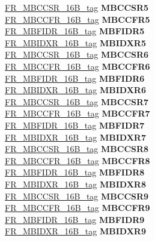 \begin{DoxyCompactItemize}
\begin{tabbing}
\>\>\mbox{\hyperlink{unionFR__MBCCSR__16B__tag}{FR\_MBCCSR\_16B\_tag}} {\bfseries MBCCSR5}\\
\>\>\mbox{\hyperlink{unionFR__MBCCFR__16B__tag}{FR\_MBCCFR\_16B\_tag}} {\bfseries MBCCFR5}\\
\>\>\mbox{\hyperlink{unionFR__MBFIDR__16B__tag}{FR\_MBFIDR\_16B\_tag}} {\bfseries MBFIDR5}\\
\>\>\mbox{\hyperlink{unionFR__MBIDXR__16B__tag}{FR\_MBIDXR\_16B\_tag}} {\bfseries MBIDXR5}\\
\>\>\mbox{\hyperlink{unionFR__MBCCSR__16B__tag}{FR\_MBCCSR\_16B\_tag}} {\bfseries MBCCSR6}\\
\>\>\mbox{\hyperlink{unionFR__MBCCFR__16B__tag}{FR\_MBCCFR\_16B\_tag}} {\bfseries MBCCFR6}\\
\>\>\mbox{\hyperlink{unionFR__MBFIDR__16B__tag}{FR\_MBFIDR\_16B\_tag}} {\bfseries MBFIDR6}\\
\>\>\mbox{\hyperlink{unionFR__MBIDXR__16B__tag}{FR\_MBIDXR\_16B\_tag}} {\bfseries MBIDXR6}\\
\>\>\mbox{\hyperlink{unionFR__MBCCSR__16B__tag}{FR\_MBCCSR\_16B\_tag}} {\bfseries MBCCSR7}\\
\>\>\mbox{\hyperlink{unionFR__MBCCFR__16B__tag}{FR\_MBCCFR\_16B\_tag}} {\bfseries MBCCFR7}\\
\>\>\mbox{\hyperlink{unionFR__MBFIDR__16B__tag}{FR\_MBFIDR\_16B\_tag}} {\bfseries MBFIDR7}\\
\>\>\mbox{\hyperlink{unionFR__MBIDXR__16B__tag}{FR\_MBIDXR\_16B\_tag}} {\bfseries MBIDXR7}\\
\>\>\mbox{\hyperlink{unionFR__MBCCSR__16B__tag}{FR\_MBCCSR\_16B\_tag}} {\bfseries MBCCSR8}\\
\>\>\mbox{\hyperlink{unionFR__MBCCFR__16B__tag}{FR\_MBCCFR\_16B\_tag}} {\bfseries MBCCFR8}\\
\>\>\mbox{\hyperlink{unionFR__MBFIDR__16B__tag}{FR\_MBFIDR\_16B\_tag}} {\bfseries MBFIDR8}\\
\>\>\mbox{\hyperlink{unionFR__MBIDXR__16B__tag}{FR\_MBIDXR\_16B\_tag}} {\bfseries MBIDXR8}\\
\>\>\mbox{\hyperlink{unionFR__MBCCSR__16B__tag}{FR\_MBCCSR\_16B\_tag}} {\bfseries MBCCSR9}\\
\>\>\mbox{\hyperlink{unionFR__MBCCFR__16B__tag}{FR\_MBCCFR\_16B\_tag}} {\bfseries MBCCFR9}\\
\>\>\mbox{\hyperlink{unionFR__MBFIDR__16B__tag}{FR\_MBFIDR\_16B\_tag}} {\bfseries MBFIDR9}\\
\>\>\mbox{\hyperlink{unionFR__MBIDXR__16B__tag}{FR\_MBIDXR\_16B\_tag}} {\bfseries MBIDXR9}\\

\end{tabbing}
\end{DoxyCompactItemize}
